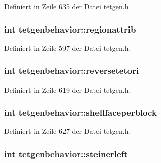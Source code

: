 Definiert in Zeile 635 der Datei tetgen.\-h.

\hypertarget{classtetgenbehavior_a9784f5c855b4aa50a0327ab1805f14f1}{
\subsubsection[{regionattrib}]{\setlength{\rightskip}{0pt plus 5cm}int tetgenbehavior\-::regionattrib}}\label{classtetgenbehavior_a9784f5c855b4aa50a0327ab1805f14f1}


Definiert in Zeile 597 der Datei tetgen.\-h.

\hypertarget{classtetgenbehavior_a7c646f38bbd222ad3fb6de6ac0aede3a}{
\subsubsection[{reversetetori}]{\setlength{\rightskip}{0pt plus 5cm}int tetgenbehavior\-::reversetetori}}\label{classtetgenbehavior_a7c646f38bbd222ad3fb6de6ac0aede3a}


Definiert in Zeile 619 der Datei tetgen.\-h.

\hypertarget{classtetgenbehavior_ade48168b9a70a4aacf9ef7ed52e967fe}{
\subsubsection[{shellfaceperblock}]{\setlength{\rightskip}{0pt plus 5cm}int tetgenbehavior\-::shellfaceperblock}}\label{classtetgenbehavior_ade48168b9a70a4aacf9ef7ed52e967fe}


Definiert in Zeile 627 der Datei tetgen.\-h.

\hypertarget{classtetgenbehavior_af6347b10c32052915e93e693d5cd687a}{
\subsubsection[{steinerleft}]{\setlength{\rightskip}{0pt plus 5cm}int tetgenbehavior\-::steinerleft}}\label{classtetgenbehavior_af6347b10c32052915e93e693d5cd687a}


